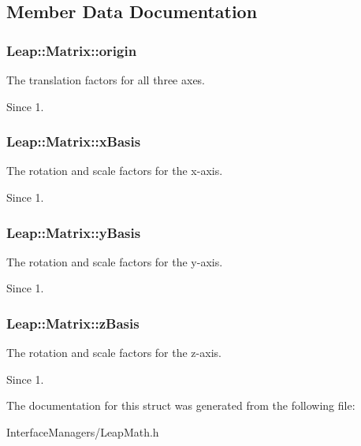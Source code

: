 \subsection{Member Data Documentation}
\hypertarget{struct_leap_1_1_matrix_a64cc576f42312999153c26b6b558fb9d}{
\subsubsection[{origin}]{ Leap\+::\+Matrix\+::origin}}\label{struct_leap_1_1_matrix_a64cc576f42312999153c26b6b558fb9d}
The translation factors for all three axes. \begin{DoxySince}{Since}
1. 
\end{DoxySince}
\hypertarget{struct_leap_1_1_matrix_a9e5e56926e88315a309007843860eced}{
\subsubsection[{x\+Basis}]{ Leap\+::\+Matrix\+::x\+Basis}}\label{struct_leap_1_1_matrix_a9e5e56926e88315a309007843860eced}
The rotation and scale factors for the x-\/axis. \begin{DoxySince}{Since}
1. 
\end{DoxySince}
\hypertarget{struct_leap_1_1_matrix_ad13e4c2baa3681ee9b92faf9da33b19b}{
\subsubsection[{y\+Basis}]{ Leap\+::\+Matrix\+::y\+Basis}}\label{struct_leap_1_1_matrix_ad13e4c2baa3681ee9b92faf9da33b19b}
The rotation and scale factors for the y-\/axis. \begin{DoxySince}{Since}
1. 
\end{DoxySince}
\hypertarget{struct_leap_1_1_matrix_a62c45d9b2370027de27781fadcfc13d8}{
\subsubsection[{z\+Basis}]{ Leap\+::\+Matrix\+::z\+Basis}}\label{struct_leap_1_1_matrix_a62c45d9b2370027de27781fadcfc13d8}
The rotation and scale factors for the z-\/axis. \begin{DoxySince}{Since}
1. 
\end{DoxySince}


The documentation for this struct was generated from the following file\+:\begin{DoxyCompactItemize}
\item 
Interface\+Managers/Leap\+Math.\+h\end{DoxyCompactItemize}
